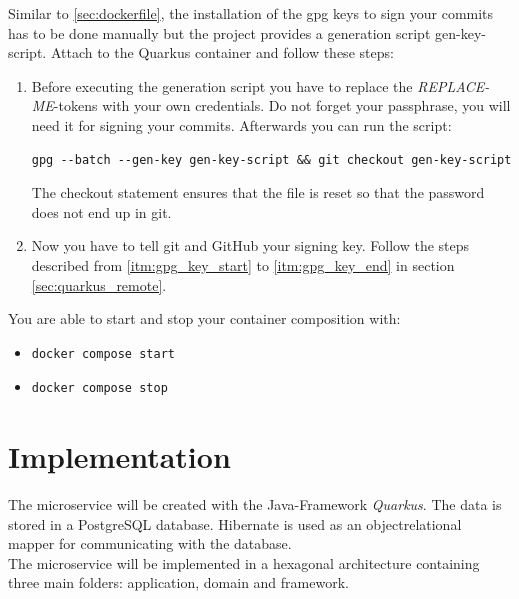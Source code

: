         Similar to \ref{sec:dockerfile}, the installation of the gpg keys to sign your commits has to be done manually but the project provides a generation script gen-key-script. Attach to the Quarkus container and follow these steps:
        \begin{enumerate}
            \item Before executing the generation script you have to replace the \textit{REPLACE-ME}-tokens with your own credentials. Do not forget your passphrase, you will need it for signing your commits. Afterwards you can run the script: 
            \begin{lstlisting}[style=bash]
gpg --batch --gen-key gen-key-script && git checkout gen-key-script
            \end{lstlisting}
            The checkout statement ensures that the file is reset so that the password does not end up in git.
            \item Now you have to tell git and GitHub your signing key. Follow the steps described from \ref{itm:gpg_key_start} to \ref{itm:gpg_key_end} in section \ref{sec:quarkus_remote}.
            \end{enumerate}

        You are able to start and stop your container composition with:
        \begin{itemize}
            \item 
                \begin{lstlisting}[style=bash]
docker compose start 
                \end{lstlisting}
                
            \item 
                \begin{lstlisting}[style=bash]
docker compose stop  
                \end{lstlisting}
            \end{itemize}




\chapter{Implementation}
    The microservice will be created with the Java-Framework \textit{Quarkus}. The data is stored in a PostgreSQL database. Hibernate is used as an objectrelational mapper for communicating with the database. \\
    The microservice will be implemented in a hexagonal architecture \autocite[cf.][]{hexagonal_architecture} containing three main folders: application, domain and framework.
    

